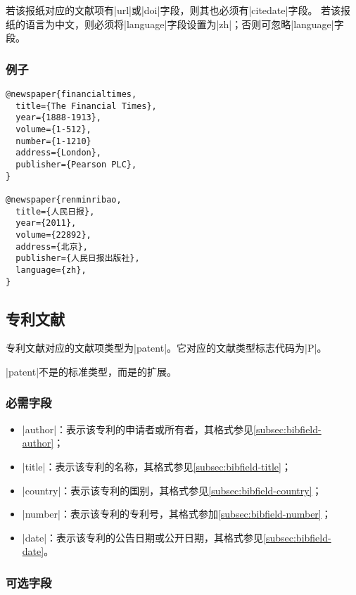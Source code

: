 \begin{note}
若该报纸对应的文献项有|url|或|doi|字段，则其也必须有|citedate|字段。
若该报纸的语言为中文，则必须将|language|字段设置为|zh|；否则可忽略|language|字段。
\end{note}

\subsubsection{例子}

\begin{verbatim}
@newspaper{financialtimes,
  title={The Financial Times},
  year={1888-1913},
  volume={1-512},
  number={1-1210}
  address={London},
  publisher={Pearson PLC},  
}

@newspaper{renminribao,
  title={人民日报},
  year={2011},
  volume={22892},
  address={北京},
  publisher={人民日报出版社},
  language={zh},
}
\end{verbatim}


\subsection{专利文献}\label{subsec:bibtype-patent}

专利文献对应的{\BibTeX}文献项类型为|patent|。它对应的文献类型标志代码为|P|\cite{gbt3469-1983}。

|patent|不是{\BibTeX}的标准类型，而是{\njuthesis}的扩展。

\subsubsection{必需字段}

\begin{itemize}
\item |author|：表示该专利的申请者或所有者，其格式参见\ref{subsec:bibfield-author}；
\item |title|：表示该专利的名称，其格式参见\ref{subsec:bibfield-title}；
\item |country|：表示该专利的国别，其格式参见\ref{subsec:bibfield-country}；
\item |number|：表示该专利的专利号，其格式参加\ref{subsec:bibfield-number}；
\item |date|：表示该专利的公告日期或公开日期，其格式参见\ref{subsec:bibfield-date}。
\end{itemize}

\subsubsection{可选字段}

